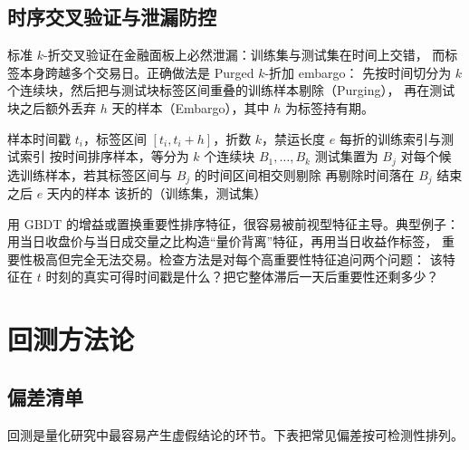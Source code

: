 \subsection{时序交叉验证与泄漏防控}

标准 $k$-折交叉验证在金融面板上必然泄漏：训练集与测试集在时间上交错，
而标签本身跨越多个交易日。正确做法是 Purged $k$-折加 embargo：
先按时间切分为 $k$ 个连续块，然后把与测试块标签区间重叠的训练样本剔除（Purging），
再在测试块之后额外丢弃 $h$ 天的样本（Embargo），其中 $h$ 为标签持有期。

\begin{algorithm}[htbp]
\caption{Purged $k$-折交叉验证与 embargo}\label{alg:07-purged}
\begin{algorithmic}[1]
\Require 样本时间戳 $t_i$，标签区间 $[t_i, t_i + h]$，折数 $k$，禁运长度 $e$
\Ensure 每折的训练索引与测试索引
\State 按时间排序样本，等分为 $k$ 个连续块 $B_1,\dots,B_k$
  \State 测试集置为 $B_j$
  \State 对每个候选训练样本，若其标签区间与 $B_j$ 的时间区间相交则剔除
  \State 再剔除时间落在 $B_j$ 结束之后 $e$ 天内的样本
  \State \Return 该折的（训练集，测试集）
\EndFor
\end{algorithmic}
\end{algorithm}

\begin{warningbox}[特征重要性不等于因果关系]
用 GBDT 的增益或置换重要性排序特征，很容易被前视型特征主导。典型例子：
用当日收盘价与当日成交量之比构造“量价背离”特征，再用当日收益作标签，
重要性极高但完全无法交易。检查方法是对每个高重要性特征追问两个问题：
该特征在 $t$ 时刻的真实可得时间戳是什么？把它整体滞后一天后重要性还剩多少？
\end{warningbox}

\section{回测方法论}

\subsection{偏差清单}

回测是量化研究中最容易产生虚假结论的环节。下表把常见偏差按可检测性排列。

